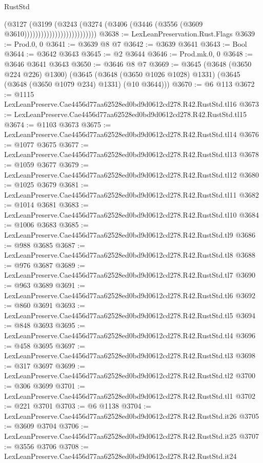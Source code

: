 \begin{lexlean}{RustStd}
\begin{coremodule}
                                        (@3127
                                          (@3199
                                            (@3243
                                              (@3274
                                                (@3406
                                                  (@3446
                                                    (@3556 (@3609 @3610))))))))))))))))))))))))))
@3638 := LexLeanPreservation.Rust.Flags
@3639 := Prod.{0, 0}
@3641 := @3639 @8 @7
@3642 := @3639 @3641
@3643 := Bool
@3644 := @3642 @3643
@3645 := @2 @3644
@3646 := Prod.mk.{0, 0}
@3648 := @3646 @3641 @3643
@3650 := @3646 @8 @7
@3669 := @3645
    (@3648 (@3650 @224 @226) @1300)
    (@3645 (@3648 (@3650 @1026 @1028) @1331) (@3645 (@3648 (@3650 @1079 @234) @1331) (@10 @3644)))
@3670 := @6 @113
@3672 := @1115 LexLeanPreserve.Cae4456d77aa62528ed0bd9d0612cd278.R42.RustStd.tl16
@3673 := LexLeanPreserve.Cae4456d77aa62528ed0bd9d0612cd278.R42.RustStd.tl15
@3674 := @1103 @3673
@3675 := LexLeanPreserve.Cae4456d77aa62528ed0bd9d0612cd278.R42.RustStd.tl14
@3676 := @1077 @3675
@3677 := LexLeanPreserve.Cae4456d77aa62528ed0bd9d0612cd278.R42.RustStd.tl13
@3678 := @1059 @3677
@3679 := LexLeanPreserve.Cae4456d77aa62528ed0bd9d0612cd278.R42.RustStd.tl12
@3680 := @1025 @3679
@3681 := LexLeanPreserve.Cae4456d77aa62528ed0bd9d0612cd278.R42.RustStd.tl11
@3682 := @1014 @3681
@3683 := LexLeanPreserve.Cae4456d77aa62528ed0bd9d0612cd278.R42.RustStd.tl10
@3684 := @1006 @3683
@3685 := LexLeanPreserve.Cae4456d77aa62528ed0bd9d0612cd278.R42.RustStd.tl9
@3686 := @988 @3685
@3687 := LexLeanPreserve.Cae4456d77aa62528ed0bd9d0612cd278.R42.RustStd.tl8
@3688 := @976 @3687
@3689 := LexLeanPreserve.Cae4456d77aa62528ed0bd9d0612cd278.R42.RustStd.tl7
@3690 := @963 @3689
@3691 := LexLeanPreserve.Cae4456d77aa62528ed0bd9d0612cd278.R42.RustStd.tl6
@3692 := @860 @3691
@3693 := LexLeanPreserve.Cae4456d77aa62528ed0bd9d0612cd278.R42.RustStd.tl5
@3694 := @848 @3693
@3695 := LexLeanPreserve.Cae4456d77aa62528ed0bd9d0612cd278.R42.RustStd.tl4
@3696 := @458 @3695
@3697 := LexLeanPreserve.Cae4456d77aa62528ed0bd9d0612cd278.R42.RustStd.tl3
@3698 := @317 @3697
@3699 := LexLeanPreserve.Cae4456d77aa62528ed0bd9d0612cd278.R42.RustStd.tl2
@3700 := @306 @3699
@3701 := LexLeanPreserve.Cae4456d77aa62528ed0bd9d0612cd278.R42.RustStd.tl1
@3702 := @221 @3701
@3703 := @6 @1138
@3704 := LexLeanPreserve.Cae4456d77aa62528ed0bd9d0612cd278.R42.RustStd.it26
@3705 := @3609 @3704
@3706 := LexLeanPreserve.Cae4456d77aa62528ed0bd9d0612cd278.R42.RustStd.it25
@3707 := @3556 @3706
@3708 := LexLeanPreserve.Cae4456d77aa62528ed0bd9d0612cd278.R42.RustStd.it24

\end{coremodule}
\end{lexlean}
